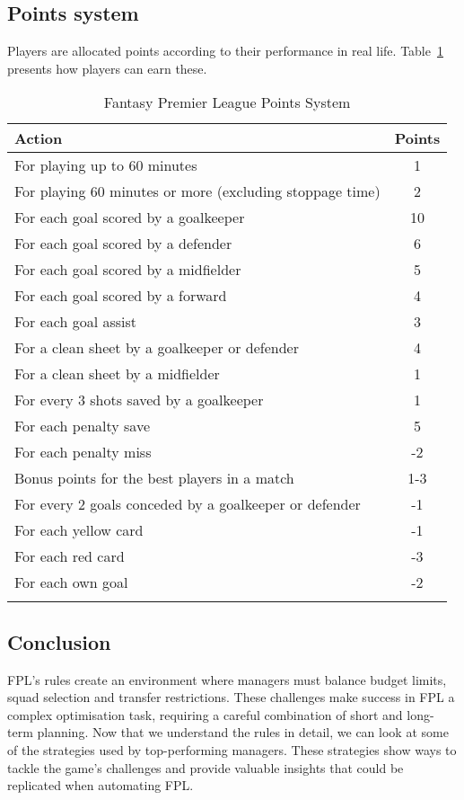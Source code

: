 \subsection{Points system}

Players are allocated points according to their performance in real life. Table~\ref{tab:fpl_points} presents how players can earn these.

\begin{longtable}{|>{\raggedright\arraybackslash}p{10cm}|c|}
\hline
\textbf{Action} & \textbf{Points} \\
\hline
For playing up to 60 minutes & 1 \\
\hline
For playing 60 minutes or more (excluding stoppage time) & 2 \\
\hline
For each goal scored by a goalkeeper & 10 \\
\hline
For each goal scored by a defender & 6 \\
\hline
For each goal scored by a midfielder & 5 \\
\hline
For each goal scored by a forward & 4 \\
\hline
For each goal assist & 3 \\
\hline
For a clean sheet by a goalkeeper or defender & 4 \\
\hline
For a clean sheet by a midfielder & 1 \\
\hline
For every 3 shots saved by a goalkeeper & 1 \\
\hline
For each penalty save & 5 \\
\hline
For each penalty miss & -2 \\
\hline
Bonus points for the best players in a match & 1-3 \\
\hline
For every 2 goals conceded by a goalkeeper or defender & -1 \\
\hline
For each yellow card & -1 \\
\hline
For each red card & -3 \\
\hline
For each own goal & -2 \\
\hline
\caption{Fantasy Premier League Points System \cite{fpl}}\label{tab:fpl_points} \\
\end{longtable}

\subsection{Conclusion}

FPL's rules create an environment where managers must balance budget limits, squad selection and transfer restrictions. These challenges make success in FPL a complex optimisation task, requiring a careful combination of short and long-term planning. Now that we understand the rules in detail, we can look at some of the strategies used by top-performing managers. These strategies show ways to tackle the game’s challenges and provide valuable insights that could be replicated when automating FPL.


